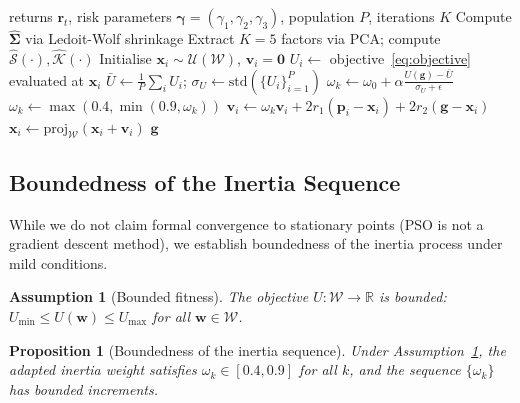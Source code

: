 \documentclass[12pt,a4paper]{article}
\newtheorem{proposition}{Proposition}
\newtheorem{assumption}{Assumption}
\begin{document}
	\begin{algorithm}[!t]
		\caption{Utility-Feedback PSO with Shrinkage Estimation}\label{alg:pso}
		\begin{algorithmic}[1]
			\Require returns $\mathbf{r}_t$, risk parameters $\boldsymbol{\gamma}=(\gamma_1,\gamma_2,\gamma_3)$, population $P$, iterations $K$
			\State Compute $\hat{\boldsymbol{\Sigma}}$ via Ledoit-Wolf shrinkage
			\State Extract $K=5$ factors via PCA; compute $\hat{\mathcal{S}}(\cdot),\hat{\mathcal{K}}(\cdot)$
			\State Initialise $\mathbf{x}_i\sim\mathcal{U}(\mathcal{W})$, $\mathbf{v}_i=\mathbf{0}$
			\State $U_i\leftarrow$ objective~\eqref{eq:objective} evaluated at $\mathbf{x}_i$
			\EndFor
			\State $\bar{U}\gets\frac{1}{P}\sum_i U_i$; $\sigma_U\gets\text{std}(\{U_i\}_{i=1}^P)$
			\State $\omega_k\gets\omega_0+\alpha\frac{U(\mathbf{g})-\bar{U}}{\sigma_U+\epsilon}$
			\State $\omega_k\gets\max(0.4,\min(0.9,\omega_k))$ 
			\State $\mathbf{v}_i\gets\omega_k\mathbf{v}_i+2r_1(\mathbf{p}_i-\mathbf{x}_i)+2r_2(\mathbf{g}-\mathbf{x}_i)$
			\State $\mathbf{x}_i\gets\text{proj}_{\mathcal{W}}(\mathbf{x}_i+\mathbf{v}_i)$
			\EndFor
			\EndFor
			\State \Return $\mathbf{g}$
		\end{algorithmic}
	\end{algorithm}
	
	\subsection{Boundedness of the Inertia Sequence}
	
	While we do not claim formal convergence to stationary points (PSO is not a gradient descent method), we establish boundedness of the inertia process under mild conditions.
	
	\begin{assumption}[Bounded fitness]\label{ass:bounded}
		The objective $U:\mathcal{W}\to\mathbb{R}$ is bounded: $U_{\min} \le U(\mathbf{w}) \le U_{\max}$ for all $\mathbf{w}\in\mathcal{W}$.
	\end{assumption}
	
	\begin{proposition}[Boundedness of the inertia sequence]\label{prop:bounded}
		Under Assumption~\ref{ass:bounded}, the adapted inertia weight satisfies $\omega_k\in[0.4,0.9]$ for all $k$, and the sequence $\{\omega_k\}$ has bounded increments.
	\end{proposition}
	
\end{document}
